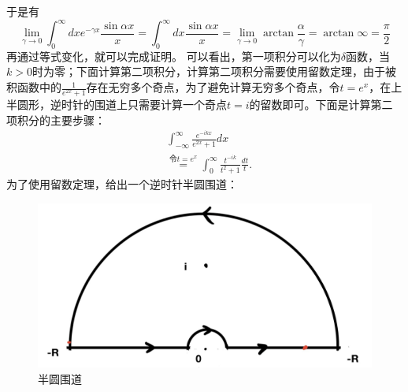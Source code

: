 于是有
\begin{equation}\label{}
    \lim _{\gamma \rightarrow 0} \int_0^{\infty} d x e^{-\gamma x} \frac{\sin \alpha x}{x}=\int_0^{\infty} d x \frac{\sin \alpha x}{x}=\lim _{\gamma \rightarrow 0} \arctan \frac{\alpha}{\gamma}=\arctan \infty=\frac{\pi}{2}
\end{equation}
再通过等式变化，就可以完成证明。
可以看出，第一项积分可以化为$\delta$函数，当$k>0$时为零；下面计算第二项积分，计算第二项积分需要使用留数定理，由于被积函数中的$\frac{1}{e^{2x}+1}$存在无穷多个奇点，为了避免计算无穷多个奇点，令$t = e^x$，在上半圆形，逆时针的围道上只需要计算一个奇点$t = i$的留数即可。下面是计算第二项积分的主要步骤：
\begin{equation}\label{2ji}
\begin{aligned}
    &  \int_{-\infty }^{\infty } \frac{e^{-ikx}}{e^{2x}+1} dx\\
    &\overset{令t=e^x}{=}\int_{0 }^{\infty } \frac{t^{-ik}}{t^2+1}\frac{dt}{t}.
\end{aligned}
\end{equation}
为了使用留数定理，给出一个逆时针半圆围道：
\begin{figure}[htbp]
    \centering
    \includegraphics[width=0.76\linewidth]{figures/cycle.png}
    \caption{半圆围道}
    \label{banyuan}
\end{figure}

